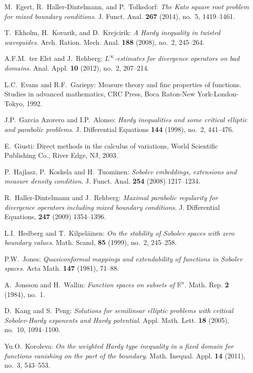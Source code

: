 \documentclass[10pt,leqno]{amsart}
\theoremstyle{definition}
\numberwithin{equation}{section}
\begin{document}
\begin{thebibliography}{11}
M.~Egert, R.~Haller-Dintelmann, and P.~Tolksdorf: \emph{The Kato square root
problem for mixed boundary conditions}. J. Funct. Anal. {\bf 267} (2014),
no.~5, 1419--1461.

T.~Ekholm, H.~Kovarik, and D.~Krejcirik: \emph{A Hardy inequality in twisted
waveguides}. Arch. Ration. Mech. Anal. {\bf 188} (2008), no.~2, 245--264.
 
A.F.M.~ter Elst and J.~Rehberg: \emph{$L^\infty$-estimates for divergence
operators on bad domains}. Anal. Appl. {\bf 10} (2012), no.~2,
207--214.

L.C.~Evans and R.F.~Gariepy: Measure theory and fine properties of functions.
Studies in advanced mathematics, CRC Press, Boca Raton-New York-London-Tokyo,
1992.

J.P.~Garcia Azorero and I.P.~Alonso: \emph{Hardy inequalities and some
critical elliptic and parabolic problems}. J. Differential Equations {\bf 144}
(1998), no.~2, 441--476.

E.~Giusti: Direct methods in the calculus of variations, World Scientific
Publishing Co., River Edge, NJ, 2003.

P.~Hajlasz, P.~Koskela and H.~Tuominen: \emph{Sobolev embeddings,
extensions and measure density condition}. J. Funct. Anal. {\bf 254} (2008)
1217--1234.

R.~Haller-Dintelmann and J.~Rehberg: \emph{Maximal parabolic regularity for
divergence operators including mixed boundary conditions}.
J. Differential Equations, {\bf 247} (2009) 1354--1396.

L.I.~Hedberg and T.~Kilpel\"ainen: \emph{On the stability of Sobolev spaces with
zero boundary values}. Math. Scand, {\bf 85} (1999), no.~2, 245--258.

P.W.~Jones: \emph{Quasiconformal mappings and extendability of functions in
Sobolev spaces}. Acta Math. {\bf 147} (1981),  71--88.

A.~Jonsson and H.~Wallin: \emph{Function spaces on subsets of ${{\mathbb R}}^n$}.
Math. Rep. {\bf 2} (1984), no.~1.

D.~Kang and S.~Peng: \emph{Solutions for semilinear elliptic problems with
critical Sobolev-Hardy exponents and Hardy potential}. Appl. Math. Lett.
{\bf 18} (2005), no.~10, 1094--1100.

Yu.O.~Koroleva: \emph{On the weighted Hardy type inequality in a fixed domain
for functions vanishing on the part of the boundary}. Math. Inequal. Appl.
{\bf 14} (2011), no.~3, 543--553.


\end{thebibliography}
\end{document}

